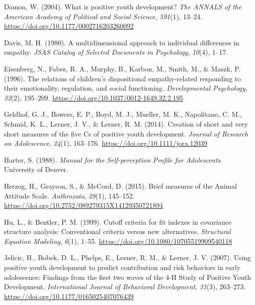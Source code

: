 \documentclass[
  jou,
  longtable,
  nolmodern,
  notxfonts,
  notimes,
  colorlinks=true,linkcolor=blue,citecolor=blue,urlcolor=blue]{apa7}
\newlength{\cslhangindent}
\newenvironment{CSLReferences}[2] %
 {\begin{list}{}{%
  \setlength{\itemindent}{0pt}
  \setlength{\leftmargin}{0pt}
  \setlength{\parsep}{0pt}
  \ifodd #1
   \setlength{\leftmargin}{\cslhangindent}
   \setlength{\itemindent}{-1\cslhangindent}
  \fi
  \setlength{\itemsep}{#2\baselineskip}}}
 {\end{list}}
\begin{document}
\begin{CSLReferences}{1}{0}
Damon, W. (2004). What is positive youth development? \emph{The ANNALS
of the American Academy of Political and Social Science}, \emph{591}(1),
13--24. \url{https://doi.org/10.1177/0002716203260092}

Davis, M. H. (1980). A multidimensional approach to individual
differences in empathy. \emph{JSAS Catalog of Selected Documents in
Psychology}, \emph{10}(4), 1--17.

Eisenberg, N., Fabes, R. A., Murphy, B., Karbon, M., Smith, M., \&
Maszk, P. (1996). The relations of children's dispositional
empathy-related responding to their emotionality, regulation, and social
functioning. \emph{Developmental Psychology}, \emph{32}(2), 195--209.
\url{https://doi.org/10.1037/0012-1649.32.2.195}

Geldhof, G. J., Bowers, E. P., Boyd, M. J., Mueller, M. K., Napolitano,
C. M., Schmid, K. L., Lerner, J. V., \& Lerner, R. M. (2014). Creation
of short and very short measures of the five {Cs} of positive youth
development. \emph{Journal of Research on Adolescence}, \emph{24}(1),
163--176. \url{https://doi.org/10.1111/jora.12039}

Harter, S. (1988). \emph{Manual for the {Self-perception Profile} for
{Adolescents}}. University of Denver.

Herzog, H., Grayson, S., \& McCord, D. (2015). Brief measures of the
{Animal Attitude Scale}. \emph{Anthrozo{ö}s}, \emph{28}(1), 145--152.
\url{https://doi.org/10.2752/089279315X14129350721894}

Hu, L., \& Bentler, P. M. (1999). Cutoff criteria for fit indexes in
covariance structure analysis: {Conventional} criteria versus new
alternatives. \emph{Structural Equation Modeling}, \emph{6}(1), 1--55.
\url{https://doi.org/10.1080/10705519909540118}

Jelicic, H., Bobek, D. L., Phelps, E., Lerner, R. M., \& Lerner, J. V.
(2007). Using positive youth development to predict contribution and
risk behaviors in early adolescence: {Findings} from the first two waves
of the 4-{H Study} of {Positive Youth Development}. \emph{International
Journal of Behavioral Development}, \emph{31}(3), 263--273.
\url{https://doi.org/10.1177/0165025407076439}


\end{CSLReferences}
\end{document}
